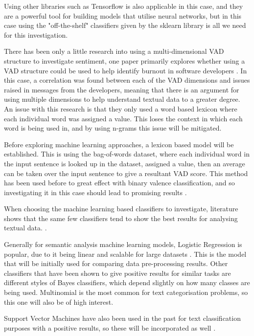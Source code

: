 Using other libraries such as Tensorflow is also applicable in this case,  and they are a powerful tool for building models that utilise neural networks, but in this case using the "off-the-shelf" classifiers given by the sklearn library is all we need for this investigation.

There has been only a little research into using a multi-dimensional VAD structure to investigate sentiment, one paper primarily explores whether using a VAD structure could be used to help identify burnout in software developers \cite{mantyla2016mining}. In this case, a correlation was found between each of the VAD dimensions and issues raised in messages from the developers, meaning that there is an argument for using multiple dimensions to help understand textual data to a greater degree. An issue with this research is that they only used a word based lexicon where each individual word was assigned a value. This loses the context in which each word is being used in, and by using n-grams this issue will be mitigated.


Before exploring machine learning approaches, a lexicon based model will be established. This is using the bag-of-words dataset, \cite{wordsData} where each individual word in the input sentence is looked up in the dataset, assigned a value, then an average can be taken over the input sentence to give a resultant VAD score. This method has been used before to great effect with binary valence classification, and so investigating it in this case should lead to promising results \cite{kolchyna2015twitter}.

When choosing the machine learning based classifiers to investigate, literature shows that the same few classifiers tend to show the best results for analysing textual data.\cite{kolchyna2015twitter} \cite{frank2006naive}.

Generally for semantic analysis machine learning models, Logistic Regression is popular, due to it being linear and scalable for large datasets \cite{towardsDS}. This is the model that will be initially used for comparing data pre-processing results.
Other classifiers that have been shown to give positive results for similar tasks are different styles of Bayes classifiers,  which depend slightly on how many classes are being used. Multinomial is the most common for text categorisation problems, so this one will also be of high interest. \cite{frank2006naive}

Support Vector Machines have also been used in the past for text classification purposes with a positive results, so these will be incorporated as well \cite{joachims1998text}.


